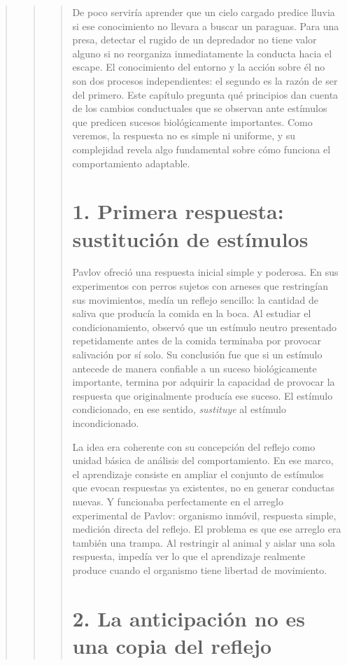 \documentclass[
  letterpaper,
  DIV=11,
  numbers=noendperiod]{scrreprt}
\begin{document}
\begin{tcolorbox}[enhanced jigsaw, arc=.35mm, bottomrule=.15mm, breakable, colback=white, colframe=quarto-callout-note-color-frame, left=2mm, leftrule=.75mm, opacityback=0, rightrule=.15mm, toprule=.15mm]
\begin{quote}
\begin{quote}
\begin{quote}
De poco serviría aprender que un cielo cargado predice lluvia si ese
conocimiento no llevara a buscar un paraguas. Para una presa, detectar
el rugido de un depredador no tiene valor alguno si no reorganiza
inmediatamente la conducta hacia el escape. El conocimiento del entorno
y la acción sobre él no son dos procesos independientes: el segundo es
la razón de ser del primero. Este capítulo pregunta qué principios dan
cuenta de los cambios conductuales que se observan ante estímulos que
predicen sucesos biológicamente importantes. Como veremos, la respuesta
no es simple ni uniforme, y su complejidad revela algo fundamental sobre
cómo funciona el comportamiento adaptable.

\mbox{}%
\section{1. Primera respuesta: sustitución de
estímulos}\label{primera-respuesta-sustituciuxf3n-de-estuxedmulos}

Pavlov ofreció una respuesta inicial simple y poderosa. En sus
experimentos con perros sujetos con arneses que restringían sus
movimientos, medía un reflejo sencillo: la cantidad de saliva que
producía la comida en la boca. Al estudiar el condicionamiento, observó
que un estímulo neutro presentado repetidamente antes de la comida
terminaba por provocar salivación por sí solo. Su conclusión fue que si
un estímulo antecede de manera confiable a un suceso biológicamente
importante, termina por adquirir la capacidad de provocar la respuesta
que originalmente producía ese suceso. El estímulo condicionado, en ese
sentido, \emph{sustituye} al estímulo incondicionado.

La idea era coherente con su concepción del reflejo como unidad básica
de análisis del comportamiento. En ese marco, el aprendizaje consiste en
ampliar el conjunto de estímulos que evocan respuestas ya existentes, no
en generar conductas nuevas. Y funcionaba perfectamente en el arreglo
experimental de Pavlov: organismo inmóvil, respuesta simple, medición
directa del reflejo. El problema es que ese arreglo era también una
trampa. Al restringir al animal y aislar una sola respuesta, impedía ver
lo que el aprendizaje realmente produce cuando el organismo tiene
libertad de movimiento.

\mbox{}%
\section{2. La anticipación no es una copia del
reflejo}\label{la-anticipaciuxf3n-no-es-una-copia-del-reflejo}


\end{quote}
\end{quote}
\end{quote}
\end{tcolorbox}
\end{document}
